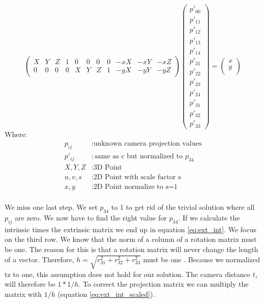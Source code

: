 \documentclass[11pt,a4paper,titlepage,oneside]{report}
\begin{document}
\begin{equation}\label{eq:projection_flat_red}
	\begin{pmatrix}
		X & Y & Z & 1 & 0 & 0 & 0 & 0 & -xX & -xY & -xZ\\
		0 & 0 & 0 & 0 & X & Y & Z & 1 & -yX & -yY & -yZ
	\end{pmatrix}
	\begin{pmatrix}
		p'_{00}\\
		p'_{11}\\
		p'_{12}\\
		p'_{13}\\
		p'_{14}\\
		p'_{21}\\
		p'_{22}\\
		p'_{23}\\
		p'_{24}\\
		p'_{31}\\
		p'_{32}\\
		p'_{33}
	\end{pmatrix}=
	\begin{pmatrix}x\\
		y\\
	\end{pmatrix}
\end{equation}
Where:
\begin{align*}
	p_{ij}		&: \text{unknown camera projection values}\\
	p'_{ij}		&: \text{same as c but normalized to $p_{34}$}\\
	X,Y,Z			&: \text{3D Point}\\
	u,v,s			&: \text{2D Point with scale factor s}\\
	x,y				&: \text{2D Point normalize to s=1}\\
\end{align*}

We miss one last step. We set $p_{34}$ to 1 to get rid of the trivial solution where all $p_{ij}$ are zero. We now have to find the right value for $p_{34}$. If we calculate the intrinsic times the extrinsic matrix we end up in equation \ref{eq:ext_int}. We focus on the third row. We know that the norm of a column of a rotation matrix must be one. The reason for this is that a rotation matrix will never change the length of a vector. Therefore, $h=\sqrt{r_{31}^2+r_{32}^2+r_{33}^2}$ must be one \cite{Wu}. Because we normalized tz to one, this assumption does not hold for our solution. The camera distance $t_z$ will therefore be $1*1/h$. To correct the projection matrix we can multiply the matrix with $1/h$ (equation \ref{eq:ext_int_scaled}).
\end{document}
